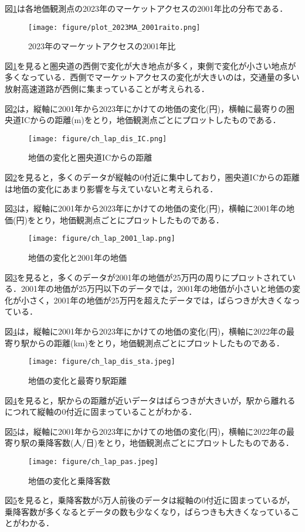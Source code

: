 図\ref{MA_2023_2001raito}は各地価観測点の2023年のマーケットアクセスの2001年比の分布である．
\begin{figure}[H]
  \centering
  \texttt{[image: figure/plot\_2023MA\_2001raito.png]}
  \caption{2023年のマーケットアクセスの2001年比}
  \label{MA_2023_2001raito}
\end{figure}
図\ref{MA_2023_2001raito}を見ると圏央道の西側で変化が大き地点が多く，東側で変化が小さい地点が多くなっている．西側でマーケットアクセスの変化が大きいのは，交通量の多い放射高速道路が西側に集まっていることが考えられる．

図\ref{deruta_landprice disIC_m}は，縦軸に2001年から2023年にかけての地価の変化(円)，横軸に最寄りの圏央道ICからの距離(m)をとり，地価観測点ごとにプロットしたものである．
\begin{figure}[H]
  \centering
  \texttt{[image: figure/ch\_lap\_dis\_IC.png]}
  \caption{地価の変化と圏央道ICからの距離}
  \label{deruta_landprice disIC_m}
\end{figure}
図\ref{deruta_landprice disIC_m}を見ると，多くのデータが縦軸の0付近に集中しており，圏央道ICからの距離は地価の変化にあまり影響を与えていないと考えられる．

図\ref{deruta_landprice_H13_landprice}は，縦軸に2001年から2023年にかけての地価の変化(円)，横軸に2001年の地価(円)をとり，地価観測点ごとにプロットしたものである．
\begin{figure}[H]
  \centering
  \texttt{[image: figure/ch\_lap\_2001\_lap.png]}
  \caption{地価の変化と2001年の地価}
  \label{deruta_landprice_H13_landprice}
\end{figure}
図\ref{deruta_landprice_H13_landprice}を見ると，多くのデータが2001年の地価が25万円の周りにプロットされている．2001年の地価が25万円以下のデータでは，2001年の地価が小さいと地価の変化が小さく，2001年の地価が25万円を超えたデータでは，ばらつきが大きくなっている．

図\ref{deruta_landprice_dis_sta}は，縦軸に2001年から2023年にかけての地価の変化(円)，横軸に2022年の最寄り駅からの距離(km)をとり，地価観測点ごとにプロットしたものである．
\begin{figure}[H]
  \centering
  \texttt{[image: figure/ch\_lap\_dis\_sta.jpeg]}
  \caption{地価の変化と最寄り駅距離}
  \label{deruta_landprice_dis_sta}
\end{figure}
図\ref{deruta_landprice_dis_sta}を見ると，駅からの距離が近いデータはばらつきが大きいが，駅から離れるにつれて縦軸の0付近に固まっていることがわかる．

図\ref{deruta_landprice_pas}は，縦軸に2001年から2023年にかけての地価の変化(円)，横軸に2022年の最寄り駅の乗降客数(人/日)をとり，地価観測点ごとにプロットしたものである．
\begin{figure}[H]
  \centering
  \texttt{[image: figure/ch\_lap\_pas.jpeg]}
  \caption{地価の変化と乗降客数}
  \label{deruta_landprice_pas}
\end{figure}
図\ref{deruta_landprice_pas}を見ると，乗降客数が5万人前後のデータは縦軸の0付近に固まっているが，乗降客数が多くなるとデータの数も少なくなり，ばらつきも大きくなっていることがわかる．




